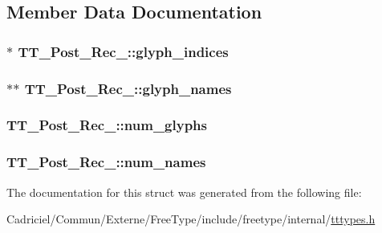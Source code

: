 \subsection{Member Data Documentation}
\hypertarget{struct_t_t___post__20_rec___a7f0a07ab96ccbe2597378f7aa2de3f8c}{
\subsubsection[{glyph\-\_\-indices}]{$\ast$ T\-T\-\_\-\-Post\-\_\-Rec\-\_\-\-::glyph\-\_\-indices}}\label{struct_t_t___post__20_rec___a7f0a07ab96ccbe2597378f7aa2de3f8c}
\hypertarget{struct_t_t___post__20_rec___a8330fbc7db3659ac621e98d7ceb8aad3}{
\subsubsection[{glyph\-\_\-names}]{$\ast$$\ast$ T\-T\-\_\-\-Post\-\_\-Rec\-\_\-\-::glyph\-\_\-names}}\label{struct_t_t___post__20_rec___a8330fbc7db3659ac621e98d7ceb8aad3}
\hypertarget{struct_t_t___post__20_rec___ae3de3677810e6581f2c197e8fa902979}{
\subsubsection[{num\-\_\-glyphs}]{ T\-T\-\_\-\-Post\-\_\-Rec\-\_\-\-::num\-\_\-glyphs}}\label{struct_t_t___post__20_rec___ae3de3677810e6581f2c197e8fa902979}
\hypertarget{struct_t_t___post__20_rec___af726ff4997521c76de36f76e1203e2b1}{
\subsubsection[{num\-\_\-names}]{ T\-T\-\_\-\-Post\-\_\-Rec\-\_\-\-::num\-\_\-names}}\label{struct_t_t___post__20_rec___af726ff4997521c76de36f76e1203e2b1}


The documentation for this struct was generated from the following file\-:\begin{DoxyCompactItemize}
\item 
Cadriciel/\-Commun/\-Externe/\-Free\-Type/include/freetype/internal/\hyperlink{tttypes_8h}{tttypes.\-h}\end{DoxyCompactItemize}
